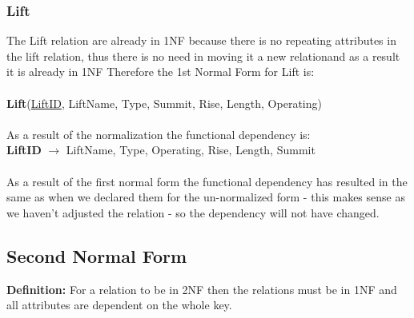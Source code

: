 \documentclass[12pt]{article}
\begin{document}
{\subsubsection{Lift}
The Lift relation are already in 1NF because there is no repeating attributes in the lift relation, thus there is no need in moving it a new relationand as a result it is already in 1NF Therefore the 1st Normal Form for Lift is: ~\\\\
\-\hspace{1.8cm}\textbf{Lift}(\uline{LiftID}, LiftName, Type, Summit, Rise, Length, Operating)~\\\\
As a result of the normalization the functional dependency is:~\\
\-\hspace{1.8cm}\textbf{LiftID} $\rightarrow$ LiftName, Type, Operating, Rise, Length, Summit~\\
\-~\\
As a result of the first normal form the functional dependency has resulted in the same as when we declared them for the un-normalized form - this makes sense as we haven't adjusted the relation - so the dependency will not have changed. 
\subsection{Second Normal Form}
\textbf{Definition:} For a relation to be in 2NF then the relations must be in 1NF and all attributes are dependent on the whole key.
}
\end{document}
